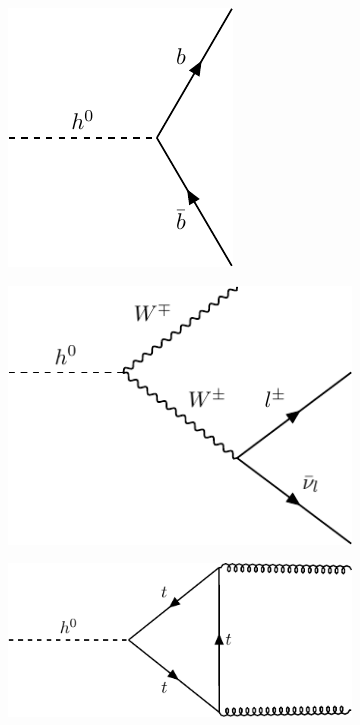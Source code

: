 \documentclass[a4paper, 11pt, normalem]{report}
\begin{document}
\begin{figure}[H]
    \centering
    \begin{subfigure}[c]{0.3\textwidth}
        \centering
        \includegraphics[scale=0.8]{higgs4.pdf}
    \end{subfigure}
    \begin{subfigure}[c]{0.3\textwidth}
        \includegraphics[width=\textwidth]{higgs5.pdf}
    \end{subfigure}
    \begin{subfigure}[c]{0.3\textwidth}
        \includegraphics[width=\textwidth]{higgs6.pdf}

\end{subfigure}
\end{figure}
\end{document}
